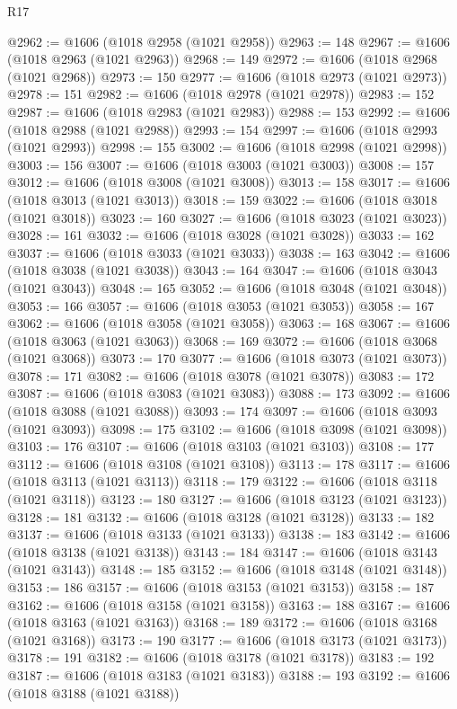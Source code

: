 \begin{lexlean}{R17}
\begin{coremodule}
@2962 := @1606 (@1018 @2958 (@1021 @2958))
@2963 := 148
@2967 := @1606 (@1018 @2963 (@1021 @2963))
@2968 := 149
@2972 := @1606 (@1018 @2968 (@1021 @2968))
@2973 := 150
@2977 := @1606 (@1018 @2973 (@1021 @2973))
@2978 := 151
@2982 := @1606 (@1018 @2978 (@1021 @2978))
@2983 := 152
@2987 := @1606 (@1018 @2983 (@1021 @2983))
@2988 := 153
@2992 := @1606 (@1018 @2988 (@1021 @2988))
@2993 := 154
@2997 := @1606 (@1018 @2993 (@1021 @2993))
@2998 := 155
@3002 := @1606 (@1018 @2998 (@1021 @2998))
@3003 := 156
@3007 := @1606 (@1018 @3003 (@1021 @3003))
@3008 := 157
@3012 := @1606 (@1018 @3008 (@1021 @3008))
@3013 := 158
@3017 := @1606 (@1018 @3013 (@1021 @3013))
@3018 := 159
@3022 := @1606 (@1018 @3018 (@1021 @3018))
@3023 := 160
@3027 := @1606 (@1018 @3023 (@1021 @3023))
@3028 := 161
@3032 := @1606 (@1018 @3028 (@1021 @3028))
@3033 := 162
@3037 := @1606 (@1018 @3033 (@1021 @3033))
@3038 := 163
@3042 := @1606 (@1018 @3038 (@1021 @3038))
@3043 := 164
@3047 := @1606 (@1018 @3043 (@1021 @3043))
@3048 := 165
@3052 := @1606 (@1018 @3048 (@1021 @3048))
@3053 := 166
@3057 := @1606 (@1018 @3053 (@1021 @3053))
@3058 := 167
@3062 := @1606 (@1018 @3058 (@1021 @3058))
@3063 := 168
@3067 := @1606 (@1018 @3063 (@1021 @3063))
@3068 := 169
@3072 := @1606 (@1018 @3068 (@1021 @3068))
@3073 := 170
@3077 := @1606 (@1018 @3073 (@1021 @3073))
@3078 := 171
@3082 := @1606 (@1018 @3078 (@1021 @3078))
@3083 := 172
@3087 := @1606 (@1018 @3083 (@1021 @3083))
@3088 := 173
@3092 := @1606 (@1018 @3088 (@1021 @3088))
@3093 := 174
@3097 := @1606 (@1018 @3093 (@1021 @3093))
@3098 := 175
@3102 := @1606 (@1018 @3098 (@1021 @3098))
@3103 := 176
@3107 := @1606 (@1018 @3103 (@1021 @3103))
@3108 := 177
@3112 := @1606 (@1018 @3108 (@1021 @3108))
@3113 := 178
@3117 := @1606 (@1018 @3113 (@1021 @3113))
@3118 := 179
@3122 := @1606 (@1018 @3118 (@1021 @3118))
@3123 := 180
@3127 := @1606 (@1018 @3123 (@1021 @3123))
@3128 := 181
@3132 := @1606 (@1018 @3128 (@1021 @3128))
@3133 := 182
@3137 := @1606 (@1018 @3133 (@1021 @3133))
@3138 := 183
@3142 := @1606 (@1018 @3138 (@1021 @3138))
@3143 := 184
@3147 := @1606 (@1018 @3143 (@1021 @3143))
@3148 := 185
@3152 := @1606 (@1018 @3148 (@1021 @3148))
@3153 := 186
@3157 := @1606 (@1018 @3153 (@1021 @3153))
@3158 := 187
@3162 := @1606 (@1018 @3158 (@1021 @3158))
@3163 := 188
@3167 := @1606 (@1018 @3163 (@1021 @3163))
@3168 := 189
@3172 := @1606 (@1018 @3168 (@1021 @3168))
@3173 := 190
@3177 := @1606 (@1018 @3173 (@1021 @3173))
@3178 := 191
@3182 := @1606 (@1018 @3178 (@1021 @3178))
@3183 := 192
@3187 := @1606 (@1018 @3183 (@1021 @3183))
@3188 := 193
@3192 := @1606 (@1018 @3188 (@1021 @3188))

\end{coremodule}
\end{lexlean}
